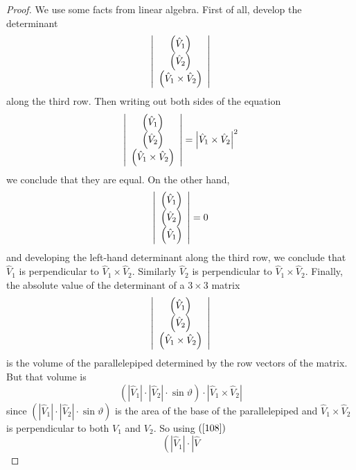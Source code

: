 \begin{proof}
We use some facts from linear algebra. First of all, develop the determinant%
\[
\left\vert
\begin{array}
[c]{c}%
\left(  \hat{V}_{1}\right) \\
\left(  \hat{V}_{2}\right) \\
\left(  \hat{V}_{1}\times\hat{V}_{2}\right)
\end{array}
\right\vert
\]
along the third row. Then writing out both sides of the equation%
\begin{equation}
\left\vert
\begin{array}
[c]{c}%
\left(  \hat{V}_{1}\right) \\
\left(  \hat{V}_{2}\right) \\
\left(  \hat{V}_{1}\times\hat{V}_{2}\right)
\end{array}
\right\vert =\left\vert \hat{V}_{1}\times\hat{V}_{2}\right\vert ^{2}
\label{108}%
\end{equation}
we conclude that they are equal. On the other hand,
\[
\left\vert
\begin{array}
[c]{c}%
\left(  \hat{V}_{1}\right) \\
\left(  \hat{V}_{2}\right) \\
\left(  \hat{V}_{1}\right)
\end{array}
\right\vert =0
\]
and developing the left-hand determinant along the third row, we conclude that
$\hat{V}_{1}$ is perpendicular to $\hat{V}_{1}\times\hat{V}_{2}$. Similarly
$\hat{V}_{2}$ is perpendicular to $\hat{V}_{1}\times\hat{V}_{2}$. Finally, the
absolute value of the determinant of a $3\times3$ matrix%
\[
\left\vert
\begin{array}
[c]{c}%
\left(  \hat{V}_{1}\right) \\
\left(  \hat{V}_{2}\right) \\
\left(  \hat{V}_{1}\times\hat{V}_{2}\right)
\end{array}
\right\vert
\]
is the volume of the parallelepiped determined by the row vectors of the
matrix. But that volume is%
\[
\left(  \left\vert \hat{V}_{1}\right\vert \cdot\left\vert \hat{V}%
_{2}\right\vert \cdot\sin\vartheta\right)  \cdot\left\vert \hat{V}%
_{1}\times\hat{V}_{2}\right\vert
\]
since $\left(  \left\vert \hat{V}_{1}\right\vert \cdot\left\vert \hat{V}%
_{2}\right\vert \cdot\sin\vartheta\right)  $ is the area of the base
of the parallelepiped and $\hat{V}_{1}\times\hat{V}_{2}$ is perpendicular to
both $V_{1}$ and $V_{2}$. So using $\left(  \ref{108}\right)  $%
\[
\left(  \left\vert \hat{V}_{1}\right\vert \cdot\left\vert \hat{V}%
\]
\end{proof}

